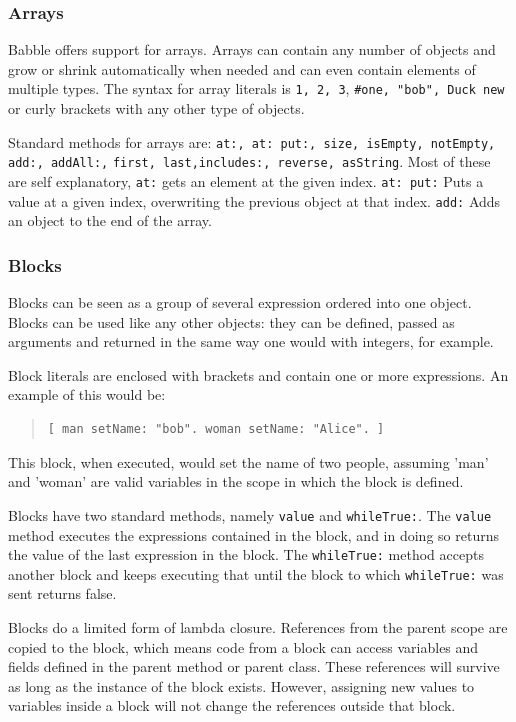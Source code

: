 \documentclass[a4paper]{article}
\begin{document}
\subsubsection{Arrays}

Babble offers support for arrays. Arrays can contain any number of objects and grow or shrink automatically when needed and can even contain elements of multiple types. The syntax for array literals is \texttt{1, 2, 3}, \texttt{\#one, "bob", Duck new} or curly brackets with any other type of objects.

Standard methods for arrays are:
\texttt{at:, at: put:, size, isEmpty, notEmpty, add:, addAll:,}
\texttt{first, last,includes:, reverse, asString}. Most of these are self explanatory, \texttt{at:} gets an element at the given index. \texttt{at: put:} Puts a value at a given index, overwriting the previous object at that index. \texttt{add:} Adds an object to the end of the array.


\subsubsection{Blocks}

Blocks can be seen as a group of several expression ordered into one object. Blocks can be used like any other objects: they can be defined, passed as arguments and returned in the same way one would with integers, for example.

Block literals are enclosed with brackets and contain one or more expressions. An example of this would be:

\begin{quote}
\begin{lstlisting}
[ man setName: "bob". woman setName: "Alice". ]
\end{lstlisting}
\end{quote}

This block, when executed, would set the name of two people, assuming 'man' and 'woman' are valid variables in the scope in which the block is defined.

Blocks have two standard methods, namely \texttt{value} and \texttt{whileTrue:}. The \texttt{value} method executes the expressions contained in the block, and in doing so returns the value of the last expression in the block. The \texttt{whileTrue:} method accepts another block and keeps executing that until the block to which \texttt{whileTrue:} was sent returns false.

Blocks do a limited form of lambda closure. References from the parent scope are copied to the block, which means code from a block can access variables and fields defined in the parent method or parent class. These references will survive as long as the instance of the block exists. However, assigning new values to variables inside a block will not change the references outside that block.
\end{document}
